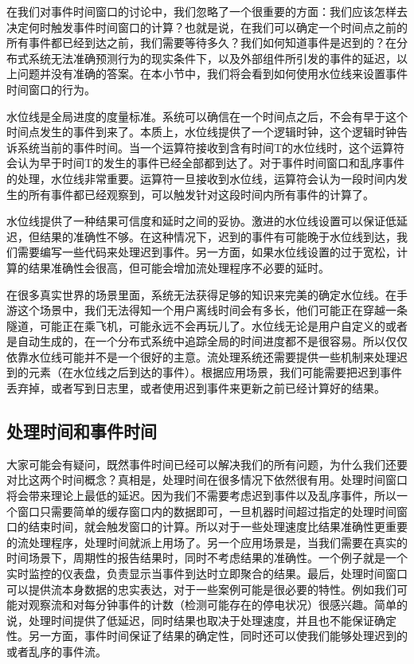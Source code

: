 \documentclass[cn,11pt,chinese]{elegantbook}
\begin{document}
在我们对事件时间窗口的讨论中，我们忽略了一个很重要的方面：我们应该怎样去决定何时触发事件时间窗口的计算？也就是说，在我们可以确定一个时间点之前的所有事件都已经到达之前，我们需要等待多久？我们如何知道事件是迟到的？在分布式系统无法准确预测行为的现实条件下，以及外部组件所引发的事件的延迟，以上问题并没有准确的答案。在本小节中，我们将会看到如何使用水位线来设置事件时间窗口的行为。

水位线是全局进度的度量标准。系统可以确信在一个时间点之后，不会有早于这个时间点发生的事件到来了。本质上，水位线提供了一个逻辑时钟，这个逻辑时钟告诉系统当前的事件时间。当一个运算符接收到含有时间T的水位线时，这个运算符会认为早于时间T的发生的事件已经全部都到达了。对于事件时间窗口和乱序事件的处理，水位线非常重要。运算符一旦接收到水位线，运算符会认为一段时间内发生的所有事件都已经观察到，可以触发针对这段时间内所有事件的计算了。

水位线提供了一种结果可信度和延时之间的妥协。激进的水位线设置可以保证低延迟，但结果的准确性不够。在这种情况下，迟到的事件有可能晚于水位线到达，我们需要编写一些代码来处理迟到事件。另一方面，如果水位线设置的过于宽松，计算的结果准确性会很高，但可能会增加流处理程序不必要的延时。

在很多真实世界的场景里面，系统无法获得足够的知识来完美的确定水位线。在手游这个场景中，我们无法得知一个用户离线时间会有多长，他们可能正在穿越一条隧道，可能正在乘飞机，可能永远不会再玩儿了。水位线无论是用户自定义的或者是自动生成的，在一个分布式系统中追踪全局的时间进度都不是很容易。所以仅仅依靠水位线可能并不是一个很好的主意。流处理系统还需要提供一些机制来处理迟到的元素（在水位线之后到达的事件）。根据应用场景，我们可能需要把迟到事件丢弃掉，或者写到日志里，或者使用迟到事件来更新之前已经计算好的结果。

\hypertarget{ux5904ux7406ux65f6ux95f4ux548cux4e8bux4ef6ux65f6ux95f4}{%
\subsection{处理时间和事件时间}\label{ux5904ux7406ux65f6ux95f4ux548cux4e8bux4ef6ux65f6ux95f4}}

大家可能会有疑问，既然事件时间已经可以解决我们的所有问题，为什么我们还要对比这两个时间概念？真相是，处理时间在很多情况下依然很有用。处理时间窗口将会带来理论上最低的延迟。因为我们不需要考虑迟到事件以及乱序事件，所以一个窗口只需要简单的缓存窗口内的数据即可，一旦机器时间超过指定的处理时间窗口的结束时间，就会触发窗口的计算。所以对于一些处理速度比结果准确性更重要的流处理程序，处理时间就派上用场了。另一个应用场景是，当我们需要在真实的时间场景下，周期性的报告结果时，同时不考虑结果的准确性。一个例子就是一个实时监控的仪表盘，负责显示当事件到达时立即聚合的结果。最后，处理时间窗口可以提供流本身数据的忠实表达，对于一些案例可能是很必要的特性。例如我们可能对观察流和对每分钟事件的计数（检测可能存在的停电状况）很感兴趣。简单的说，处理时间提供了低延迟，同时结果也取决于处理速度，并且也不能保证确定性。另一方面，事件时间保证了结果的确定性，同时还可以使我们能够处理迟到的或者乱序的事件流。
\end{document}
